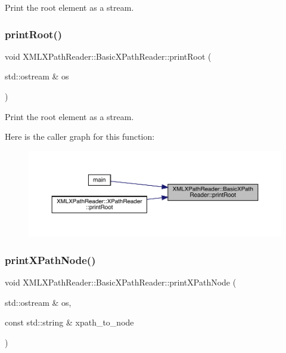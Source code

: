 Print the root element as a stream. 

\mbox{\label{classXMLXPathReader_1_1BasicXPathReader_abc0bfad898a5b01d2251d7aaacbbb507}} 
\subsubsection{\texorpdfstring{printRoot()}{printRoot()}\hspace{0.1cm}{\footnotesize\ttfamily [3/3]}}
{\footnotesize\ttfamily void X\+M\+L\+X\+Path\+Reader\+::\+Basic\+X\+Path\+Reader\+::print\+Root (\begin{DoxyParamCaption}\item[{std\+::ostream \&}]{os }\end{DoxyParamCaption})}



Print the root element as a stream. 

Here is the caller graph for this function\+:
\nopagebreak
\begin{figure}[H]
\begin{center}
\leavevmode
\includegraphics[width=350pt]{d6/dbf/classXMLXPathReader_1_1BasicXPathReader_abc0bfad898a5b01d2251d7aaacbbb507_icgraph}
\end{center}
\end{figure}
\mbox{\label{classXMLXPathReader_1_1BasicXPathReader_afba694dbda7c2e1c26ca344085bfffb6}} 
\subsubsection{\texorpdfstring{printXPathNode()}{printXPathNode()}\hspace{0.1cm}{\footnotesize\ttfamily [1/3]}}
{\footnotesize\ttfamily void X\+M\+L\+X\+Path\+Reader\+::\+Basic\+X\+Path\+Reader\+::print\+X\+Path\+Node (\begin{DoxyParamCaption}\item[{std\+::ostream \&}]{os,  }\item[{const std\+::string \&}]{xpath\+\_\+to\+\_\+node }\end{DoxyParamCaption})}



